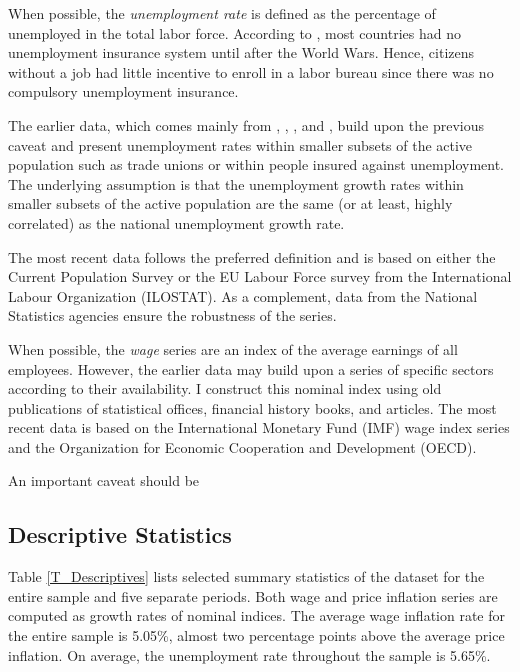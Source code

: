 \documentclass[12pt]{article}
\begin{document}
When possible, the \textit{unemployment rate} is defined as the percentage of unemployed in the total labor force. According to \cite{Rasmussen2018}, most countries had no unemployment insurance system until after the World Wars. Hence, citizens without a job had little incentive to enroll in a labor bureau since there was no compulsory unemployment insurance. 

The earlier data, which comes mainly from \cite{Mitchell2013}, \cite{Tabin2013}, \cite{Maddison1982}, and \cite{Galenson1957}, build upon the previous caveat and present unemployment rates within smaller subsets of the active population such as trade unions or within people insured against unemployment. The underlying assumption is that the unemployment growth rates within smaller subsets of the active population are the same (or at least, highly correlated) as the national unemployment growth rate.

The most recent data follows the preferred definition and is based on either the Current Population Survey or the EU Labour Force survey from the International Labour Organization (ILOSTAT). As a complement, data from the National Statistics agencies ensure the robustness of the series.

When possible, the \textit{wage} series are an index of the average earnings of all employees. However, the earlier data may build upon a series of specific sectors according to their availability. I construct this nominal index using old publications of statistical offices, financial history books, and articles. The most recent data is based on the International Monetary Fund (IMF) wage index series and the Organization for Economic Cooperation and Development (OECD).

An important caveat should be 

\subsection{Descriptive Statistics}

Table \ref{T_Descriptives} lists selected summary statistics of the dataset for the entire sample and five separate periods. Both wage and price inflation series are computed as growth rates of nominal indices. The average wage inflation rate for the entire sample is 5.05\%, almost two percentage points above the average price inflation. On average, the unemployment rate throughout the sample is 5.65\%.


\end{document}
